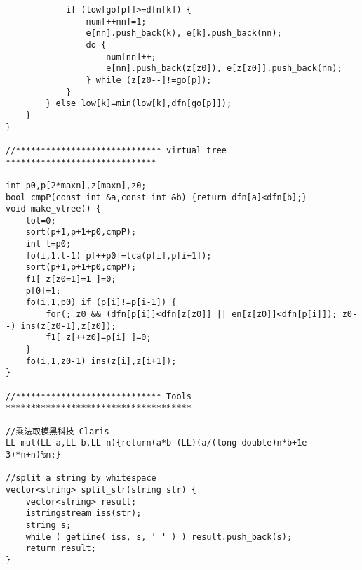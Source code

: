\documentclass{article}
\begin{document}
\begin{lstlisting}
            if (low[go[p]]>=dfn[k]) {
                num[++nn]=1;
                e[nn].push_back(k), e[k].push_back(nn);
                do {
                    num[nn]++;
                    e[nn].push_back(z[z0]), e[z[z0]].push_back(nn);
                } while (z[z0--]!=go[p]);
            }
        } else low[k]=min(low[k],dfn[go[p]]);
    }
}

//***************************** virtual tree ******************************

int p0,p[2*maxn],z[maxn],z0;
bool cmpP(const int &a,const int &b) {return dfn[a]<dfn[b];}
void make_vtree() {
    tot=0;
    sort(p+1,p+1+p0,cmpP);
    int t=p0;
    fo(i,1,t-1) p[++p0]=lca(p[i],p[i+1]);
    sort(p+1,p+1+p0,cmpP);
    f1[ z[z0=1]=1 ]=0;
    p[0]=1;
    fo(i,1,p0) if (p[i]!=p[i-1]) {
        for(; z0 && (dfn[p[i]]<dfn[z[z0]] || en[z[z0]]<dfn[p[i]]); z0--) ins(z[z0-1],z[z0]);
        f1[ z[++z0]=p[i] ]=0;
    }
    fo(i,1,z0-1) ins(z[i],z[i+1]);
}

//***************************** Tools *************************************

//乘法取模黑科技 Claris
LL mul(LL a,LL b,LL n){return(a*b-(LL)(a/(long double)n*b+1e-3)*n+n)%n;}

//split a string by whitespace
vector<string> split_str(string str) {
    vector<string> result;
    istringstream iss(str);
    string s;
    while ( getline( iss, s, ' ' ) ) result.push_back(s);
    return result;
}
\end{lstlisting}
\end{document}
